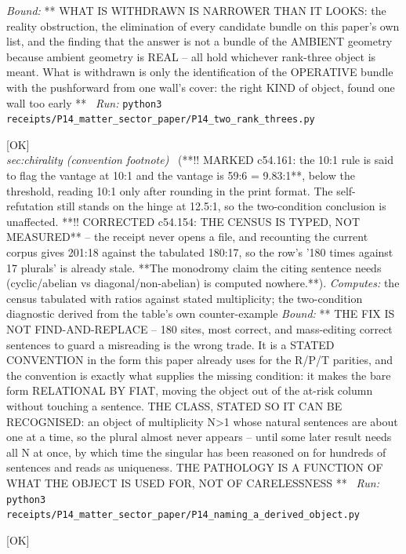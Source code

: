\begin{description}
 \emph{Bound:} ** WHAT IS WITHDRAWN IS NARROWER THAN IT LOOKS: the reality obstruction, the elimination of every candidate bundle on this paper's own list, and the finding that the answer is not a bundle of the AMBIENT geometry because ambient geometry is REAL -- all hold whichever rank-three object is meant. What is withdrawn is only the identification of the OPERATIVE bundle with the pushforward from one wall's cover: the right KIND of object, found one wall too early **
\ \emph{Run:} \texttt{python3 receipts/P14\_matter\_sector\_paper/P14\_two\_rank\_threes.py}
\item[\label{rcpt:P14_naming_a_derived_object}\texttt{P14\_naming\_a\_derived\_object}]\hfill\textsf{[OK]}\\
\textit{sec:chirality (convention footnote)} \ (**!! MARKED c54.161: the 10:1 rule is said to flag the vantage at 10:1 and the vantage is 59:6 = 9.83:1**, below the threshold, reading 10:1 only after rounding in the print format. The self-refutation still stands on the hinge at 12.5:1, so the two-condition conclusion is unaffected. **!! CORRECTED c54.154: THE CENSUS IS TYPED, NOT MEASURED** -- the receipt never opens a file, and recounting the current corpus gives 201:18 against the tabulated 180:17, so the row's '180 times against 17 plurals' is already stale. **The monodromy claim the citing sentence needs (cyclic/abelian vs diagonal/non-abelian) is computed nowhere.**). 
\emph{Computes:} the census tabulated with ratios against stated multiplicity; the two-condition diagnostic derived from the table's own counter-example
 \emph{Bound:} ** THE FIX IS NOT FIND-AND-REPLACE -- 180 sites, most correct, and mass-editing correct sentences to guard a misreading is the wrong trade. It is a STATED CONVENTION in the form this paper already uses for the R/P/T parities, and the convention is exactly what supplies the missing condition: it makes the bare form RELATIONAL BY FIAT, moving the object out of the at-risk column without touching a sentence. THE CLASS, STATED SO IT CAN BE RECOGNISED: an object of multiplicity N>1 whose natural sentences are about one at a time, so the plural almost never appears -- until some later result needs all N at once, by which time the singular has been reasoned on for hundreds of sentences and reads as uniqueness. THE PATHOLOGY IS A FUNCTION OF WHAT THE OBJECT IS USED FOR, NOT OF CARELESSNESS **
\ \emph{Run:} \texttt{python3 receipts/P14\_matter\_sector\_paper/P14\_naming\_a\_derived\_object.py}
\item[\label{rcpt:P14_the_family_symmetry_is_cyclic}\texttt{P14\_the\_family\_symmetry\_is\_cyclic}]\hfill\textsf{[OK]}\\

\end{description}
